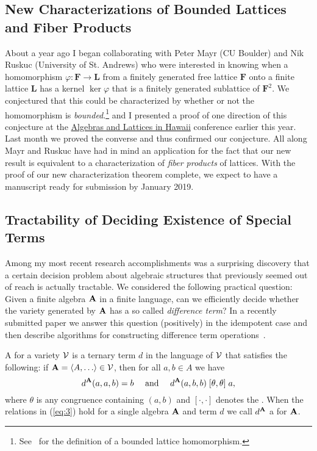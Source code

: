 \subsection{New Characterizations of Bounded Lattices and Fiber Products}
\label{sec:fiber}
About a year ago I began collaborating with Peter Mayr (CU Boulder) and Nik Ruskuc (University of St. Andrews) who were interested in knowing when a homomorphism $\varphi \colon \mathbf{F} \to \mathbf{L}$ from a finitely generated free lattice $\mathbf{F}$ onto a finite lattice $\mathbf L$ has a kernel $\ker \varphi$ that is a finitely generated sublattice of $\mathbf{F}^2$.  We conjectured that this could be characterized by whether or not the homomorphism is \emph{bounded}.\footnote{See~\cite{MR1319815} for the definition of a bounded lattice homomorphism.} and I presented a proof of one direction of this conjecture at the \href{https://universalalgebra.github.io/ALH-2018/}{Algebras and Lattices in Hawaii} conference earlier this year. Last month we proved the converse and thus confirmed our conjecture.  All along Mayr and Ruskuc have had in mind an application for the fact that our new result is equivalent to a characterization of \emph{fiber products} of lattices.  With the proof of our new characterization theorem complete, we expect to have a manuscript ready for submission by January 2019.  


\subsection{Tractability of Deciding Existence of Special Terms}
\label{sec:diffterm}
Among my most recent research accomplishments was a surprising discovery that a certain decision problem about algebraic structures that previously seemed out of reach is actually tractable. 
We considered the following practical question: Given a finite
algebra $\mathbf{A}$ in a finite language, can we efficiently decide whether the variety generated by $\mathbf{A}$ has a so called \emph{difference term}?  In a recently submitted paper we answer this question (positively) in the idempotent case and then describe algorithms for constructing difference term operations~\cite{DFV:2018}.
 
A  for a variety $\mathcal{V}$ is a ternary term $d$ in the language of $\mathcal{V}$ that satisfies the following:  if $\alg{A} = \<A, \dots \> \in \sV$, then for all $a, b \in A$ we have
  \begin{equation}
  \label{eq:3}
  d^{\mathbf{A}}(a,a,b) = b \quad \text{ and } \quad
  d^{\mathbf{A}}(a,b,b) \mathrel{[\theta, \theta]} a,
  \end{equation}
  where $\theta$ is any congruence %
  containing $(a,b)$
  and $[\cdot, \cdot]$ denotes the .
  When the relations in (\ref{eq:3}) hold for a single algebra $\mathbf{A}$ and term $d$ we call $d^{\mathbf{A}}$
  a  for $\mathbf{A}$.
  
